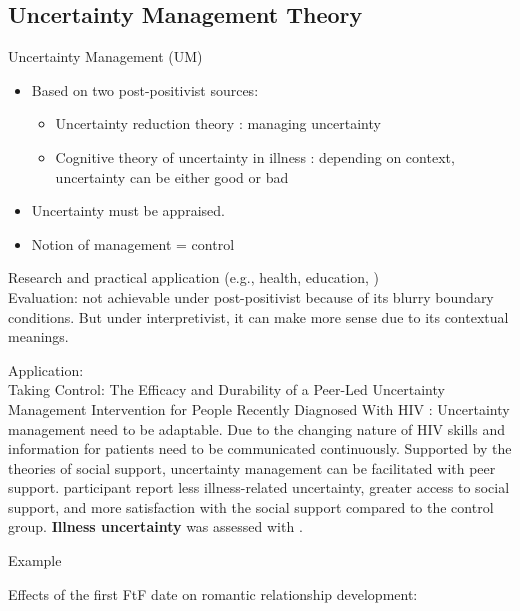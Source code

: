 \documentclass[
]{book}
\providecommand{\tightlist}{%
  \setlength{\itemsep}{0pt}\setlength{\parskip}{0pt}}
\begin{document}
\hypertarget{uncertainty-management-theory}{%
\subsection{Uncertainty Management Theory}\label{uncertainty-management-theory}}

Uncertainty Management (UM)

\begin{itemize}
\item
  Based on two post-positivist sources:

  \begin{itemize}
  \tightlist
  \item
    Uncertainty reduction theory \citep{BERGER_1975}: managing uncertainty\\
  \item
    Cognitive theory of uncertainty in illness \citep{Mishel_1990}: depending on context, uncertainty can be either good or bad\\
  \end{itemize}
\item
  Uncertainty must be appraised.\\
\item
  Notion of management = control
\end{itemize}

Research and practical application (e.g., health, education, )\\
Evaluation: not achievable under post-positivist because of its blurry boundary conditions. But under interpretivist, it can make more sense due to its contextual meanings.

Application:\\
Taking Control: The Efficacy and Durability of a Peer-Led Uncertainty Management Intervention for People Recently Diagnosed With HIV \citep{Brashers_2016}: Uncertainty management need to be adaptable. Due to the changing nature of HIV skills and information for patients need to be communicated continuously. Supported by the theories of social support, uncertainty management can be facilitated with peer support. participant report less illness-related uncertainty, greater access to social support, and more satisfaction with the social support compared to the control group. \textbf{Illness uncertainty} was assessed with \citep{MISHEL_1981}.

Example

\citep{SHARABI_2017} Effects of the first FtF date on romantic relationship development:
\end{document}
